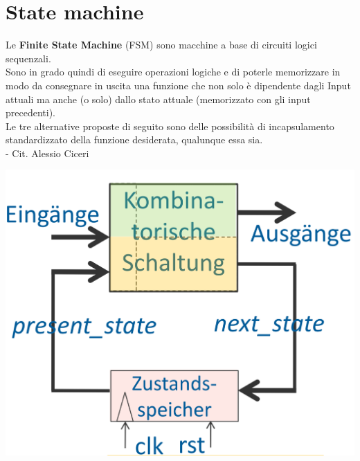 \section{State machine}
    \begin{minipage}[t]{0.48\columnwidth}
        \vspace{0pt} %
        Le \textbf{Finite State Machine} (FSM) sono macchine a base di circuiti logici sequenzali.\\
        Sono in grado quindi 
        di eseguire operazioni logiche e di poterle memorizzare in modo da consegnare in uscita una funzione
        che non solo è dipendente dagli Input attuali ma anche (o solo) dallo stato attuale (memorizzato con gli input precedenti).\\
        Le tre alternative proposte di seguito sono delle possibilità di incapsulamento standardizzato
        della funzione desiderata, qualunque essa sia.\\
        - Cit. Alessio Ciceri
    \end{minipage}
    \hfill
    \begin{minipage}[t]{0.48\columnwidth}
        \vspace{0pt} %
        \includegraphics[width=\linewidth]{Images/FSMGeneralizzata.png}
    \end{minipage}%
    

